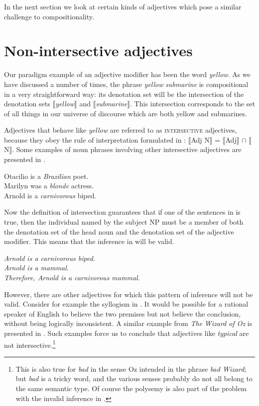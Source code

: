 In the next section we look at certain kinds of adjectives which pose a similar challenge to compositionality.


\section{Non-intersective adjectives}\label{sec:15.3}

Our paradigm example of an adjective modifier has been the word \textit{yellow}. As we have discussed a number of times, the phrase \textit{yellow} \textit{submarine} is compositional in a very straightforward way: its denotation set will be the intersection of the denotation sets $\llbracket$\textit{yellow}$\rrbracket$  and $\llbracket$\textit{submarine}$\rrbracket$. This intersection corresponds to the set of all things in our universe of discourse which are both yellow and submarines.



Adjectives that behave like \textit{yellow} are referred to as \textsc{intersective} adjectives, because they obey the rule of interpretation formulated in : $\llbracket$Adj N$\rrbracket$  = $\llbracket$Adj$\rrbracket$  ${\cap}$ $\llbracket$N$\rrbracket$. Some examples of noun phrases involving other intersective adjectives are presented in .


\ea \label{ex:15.4}
\ea  Otacilio is a \textit{Brazilian} poet.\\
\ex Marilyn was a \textit{blonde} actress.\\
\ex Arnold is a \textit{carnivorous} biped.
                       \z
\z


Now the definition of intersection guarantees that if one of the sentences in  is true, then the individual named by the subject NP must be a member of both the denotation set of the head noun and the denotation set of the adjective modifier. This means that the inference in  will be valid.


\ea \label{ex:15.5}
\textit{Arnold is a carnivorous biped.}\\
\textit{Arnold is a mammal.\\
\FelixHRule
Therefore, Arnold is a carnivorous mammal.}
\z


However, there are other adjectives for which this pattern of inference will not be valid. Consider for example the syllogism in . It would be possible for a rational speaker of English to believe the two premises but not believe the conclusion, without being logically inconsistent. A similar example from \textit{The} \textit{Wizard of Oz} is presented in . Such examples force us to conclude that adjectives like \textit{typical} are not intersective.\footnote{This is also true for \textit{bad} in the sense Oz intended in the phrase \textit{bad Wizard}; but \textit{bad} is a tricky word, and the various senses probably do not all belong to the same semantic type. Of course the polysemy is also part of the problem with the invalid inference in .}


